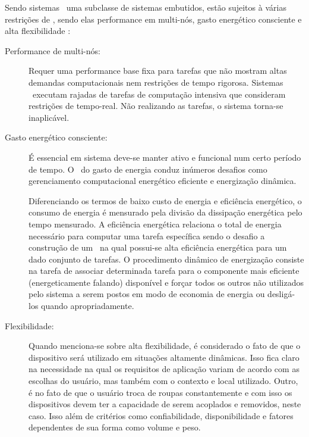 		Sendo sistemas \wearables\ uma subclasse de sistemas embutidos, estão sujeitos à várias restrições de \design, sendo elas performance em multi-nós, gasto energético consciente e alta flexibilidade \citep{Plessl2003}:

     \begin{description}
       	\item [Performance de multi-nós:] Requer uma performance base fixa para tarefas que não mostram altas demandas computacionais nem restrições de tempo rigorosa.
            Sistemas \wearables\ executam rajadas de tarefas de computação intensiva que consideram restrições de tempo-real.
            Não realizando as tarefas, o sistema torna-se inaplicável.

		   \item [Gasto energético consciente:] É essencial em sistema deve-se manter ativo e funcional num certo período de tempo.
            O \design\ do gasto de energia conduz inúmeros desafios como gerenciamento computacional energético eficiente e energização dinâmica.

            Diferenciando os termos de baixo custo de energia e eficiência energético, o consumo de energia é mensurado pela divisão da dissipação energética pelo tempo mensurado.
            A eficiência energética relaciona o total de energia necessário para computar uma tarefa específica sendo o desafio a construção de um \design\ na qual possui-se alta eficiência energética para um dado conjunto de tarefas.
            O procedimento dinâmico de energização consiste na tarefa de associar determinada tarefa para o componente mais eficiente (energeticamente falando) disponível e forçar todos os outros não utilizados pelo sistema a serem postos em modo de economia de energia ou desligá-los quando apropriadamente.

   		\item [Flexibilidade:] Quando menciona-se sobre alta flexibilidade, é considerado o fato de que o dispositivo será utilizado em situações altamente dinâmicas.
            Isso fica claro na necessidade na qual os requisitos de aplicação variam de acordo com as escolhas do usuário, mas também com o contexto e local utilizado.
            Outro, é no fato de que o usuário troca de roupas constantemente e com isso os dispositivos devem ter a capacidade de serem acoplados e removidos, neste caso.
            Isso além de critérios como confiabilidade, disponibilidade e fatores dependentes de sua forma como volume e peso.
     \end{description}

